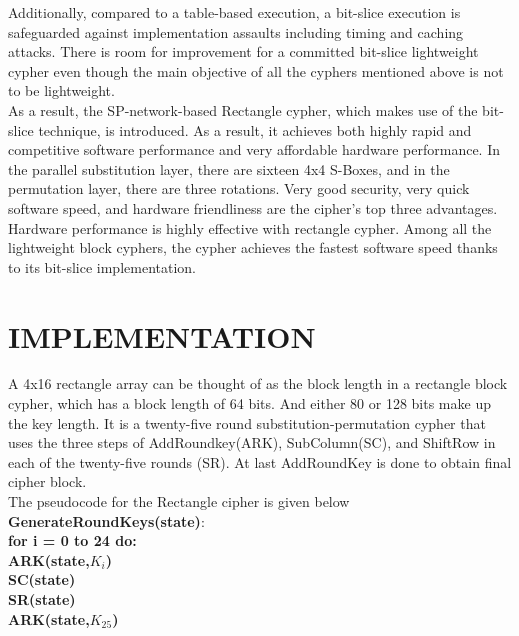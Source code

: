 \documentclass[journal=tosc,preprint]{iacrtrans}
\begin{document}
\hspace*{1cm}Additionally, compared to a table-based execution, a bit-slice execution is safeguarded against implementation assaults including timing and caching attacks. There is room for improvement for a committed bit-slice lightweight cypher even though the main objective of all the cyphers mentioned above is not to be lightweight.\\
\hspace*{1cm}As a result, the SP-network-based Rectangle cypher, which makes use of the bit-slice technique, is introduced. As a result, it achieves both highly rapid and competitive software performance and very affordable hardware performance. In the parallel substitution layer, there are sixteen 4x4 S-Boxes, and in the permutation layer, there are three rotations. Very good security, very quick software speed, and hardware friendliness are the cipher's top three advantages.\\
\hspace*{1cm}Hardware performance is highly effective with rectangle cypher. Among all the lightweight block cyphers, the cypher achieves the fastest software speed thanks to its bit-slice implementation.
\section{IMPLEMENTATION}
A 4x16 rectangle array can be thought of as the block length in a rectangle block cypher, which has a block length of 64 bits. And either 80 or 128 bits make up the key length. It is a twenty-five round substitution-permutation cypher that uses the three steps of AddRoundkey(ARK), SubColumn(SC), and ShiftRow in each of the twenty-five rounds (SR). At last AddRoundKey is done to obtain final cipher block.\\
\hspace*{1cm}The pseudocode for the Rectangle cipher is given below\\
\textbf{GenerateRoundKeys(state)}:\\
\hspace*{1cm}\textbf{for i = 0 to 24 do:}\\
\hspace*{2cm}\textbf{ARK(state,$K_i$)}\\
\hspace*{2cm}\textbf{SC(state)}\\
\hspace*{2cm}\textbf{SR(state)}\\
\hspace*{1cm}\textbf{ARK(state,$K_{25}$)}\\
\end{document}

